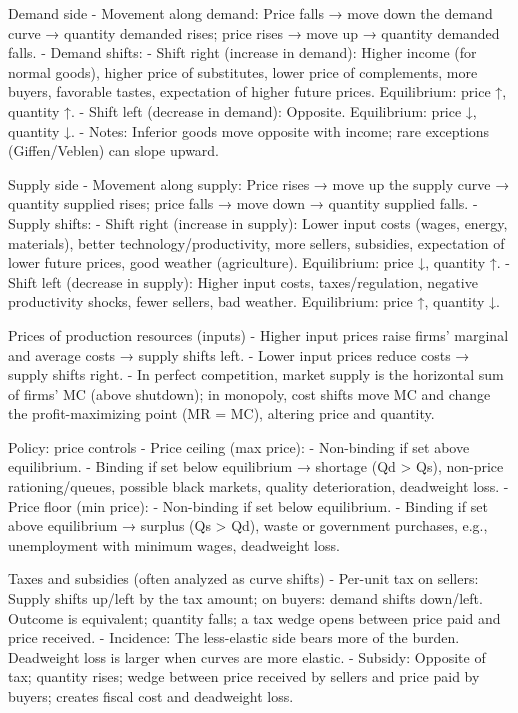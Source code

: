 Demand side
- Movement along demand: Price falls → move down the demand curve → quantity demanded rises; price rises → move up → quantity demanded falls.
- Demand shifts:
  - Shift right (increase in demand): Higher income (for normal goods), higher price of substitutes, 
  lower price of complements, more buyers, favorable tastes, expectation of higher future prices. Equilibrium: price ↑, quantity ↑.
  - Shift left (decrease in demand): Opposite. Equilibrium: price ↓, quantity ↓.
- Notes: Inferior goods move opposite with income; rare exceptions (Giffen/Veblen) can slope upward.

Supply side
- Movement along supply: Price rises → move up the supply curve → quantity supplied rises; price falls → move down → quantity supplied falls.
- Supply shifts:
  - Shift right (increase in supply): 
  Lower input costs (wages, energy, materials), 
  better technology/productivity, more sellers, subsidies, expectation of lower future prices, good weather (agriculture). 
  Equilibrium: price ↓, quantity ↑.
  - Shift left (decrease in supply): Higher input costs, taxes/regulation, negative productivity shocks, fewer sellers, bad weather. 
  Equilibrium: price ↑, quantity ↓.

Prices of production resources (inputs)
- Higher input prices raise firms’ marginal and average costs → supply shifts left.
- Lower input prices reduce costs → supply shifts right.
- In perfect competition, market supply is the horizontal sum of firms’ MC (above shutdown); 
in monopoly, cost shifts move MC and change the profit-maximizing point (MR = MC), altering price and quantity.

Policy: price controls
- Price ceiling (max price):
  - Non-binding if set above equilibrium.
  - Binding if set below equilibrium → shortage (Qd > Qs), non-price rationing/queues, possible black markets, quality deterioration, deadweight loss.
- Price floor (min price):
  - Non-binding if set below equilibrium.
  - Binding if set above equilibrium → surplus (Qs > Qd), waste or government purchases, e.g., unemployment with minimum wages, deadweight loss.

Taxes and subsidies (often analyzed as curve shifts)
- Per-unit tax on sellers: Supply shifts up/left by the tax amount; 
on buyers: demand shifts down/left. Outcome is equivalent; quantity falls; a tax wedge opens between price paid and price received.
- Incidence: The less-elastic side bears more of the burden. Deadweight loss is larger when curves are more elastic.
- Subsidy: Opposite of tax; quantity rises; wedge between price received by sellers and price paid by buyers; creates fiscal cost and deadweight loss.

